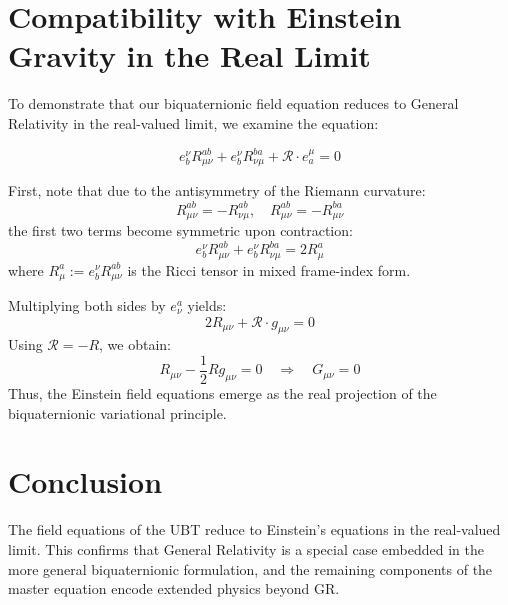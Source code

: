 \documentclass[11pt]{article}
\begin{document}
\section{Compatibility with Einstein Gravity in the Real Limit}

To demonstrate that our biquaternionic field equation reduces to General Relativity in the real-valued limit, we examine the equation:

\[
e^\nu_b R_{\mu\nu}^{ab} + e^\nu_b R_{\nu\mu}^{ba} + \mathcal{R} \cdot e^\mu_a = 0
\]

First, note that due to the antisymmetry of the Riemann curvature:
\[
R_{\mu\nu}^{ab} = - R_{\nu\mu}^{ab}, \quad R_{\mu\nu}^{ab} = - R_{\mu\nu}^{ba}
\]
the first two terms become symmetric upon contraction:
\[
e^\nu_b R_{\mu\nu}^{ab} + e^\nu_b R_{\nu\mu}^{ba} = 2 R^a_\mu
\]
where \( R^a_\mu := e^\nu_b R_{\mu\nu}^{ab} \) is the Ricci tensor in mixed frame-index form.

Multiplying both sides by \( e^a_\nu \) yields:
\[
2 R_{\mu\nu} + \mathcal{R} \cdot g_{\mu\nu} = 0
\]
Using \( \mathcal{R} = -R \), we obtain:
\[
R_{\mu\nu} - \frac{1}{2} R g_{\mu\nu} = 0 \quad \Rightarrow \quad G_{\mu\nu} = 0
\]
Thus, the Einstein field equations emerge as the real projection of the biquaternionic variational principle.


\section{Conclusion}
The field equations of the UBT reduce to Einstein's equations in the real-valued limit. This confirms that General Relativity is a special case embedded in the more general biquaternionic formulation, and the remaining components of the master equation encode extended physics beyond GR.
\end{document}
